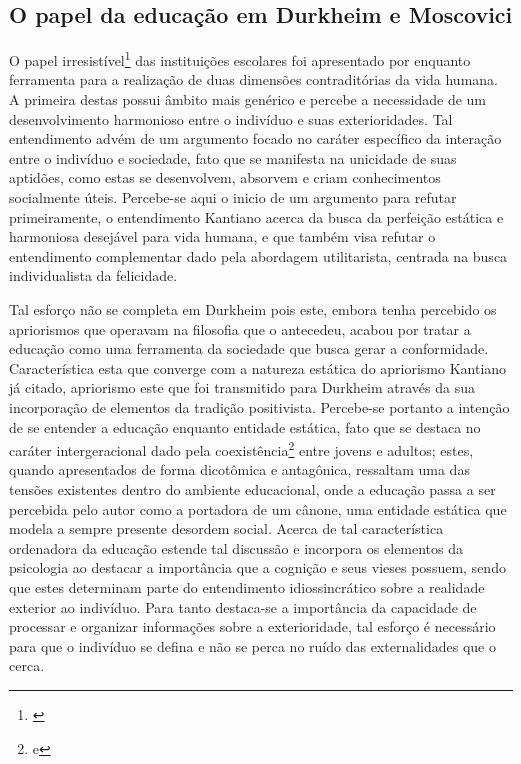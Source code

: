 \documentclass[
   article,       %
   12pt,          %
   oneside,       %
   a4paper,       %
   english,       %
   brazil,           %
   sumario=tradicional
   ]{abntex2}
\begin{document}
\subsection{O papel da educação em Durkheim e Moscovici}

O papel irresistível\footnote{\cite[p.47]{Durkheim_Educacao}} das instituições escolares foi apresentado por \cite{Durkheim_Educacao} enquanto ferramenta para a realização de duas dimensões contraditórias da vida humana. A primeira destas possui âmbito mais genérico e percebe a necessidade de um desenvolvimento harmonioso entre o indivíduo e suas exterioridades. Tal entendimento advém de um argumento focado no caráter específico da interação entre o indivíduo e sociedade, fato que se manifesta na unicidade de suas aptidões, como estas se desenvolvem, absorvem e criam conhecimentos socialmente úteis. Percebe-se aqui o inicio de um argumento para refutar primeiramente, o entendimento Kantiano acerca da busca da perfeição estática e harmoniosa desejável para vida humana, e que também visa refutar o entendimento complementar dado pela abordagem utilitarista, centrada na busca individualista da felicidade. 

Tal esforço não se completa em Durkheim pois este, embora tenha percebido os apriorismos que operavam na filosofia que o antecedeu, acabou por tratar a educação como uma ferramenta da sociedade que busca gerar a conformidade. Característica esta que converge com a natureza estática do apriorismo Kantiano já citado, apriorismo este que foi transmitido para Durkheim através da sua incorporação de elementos da tradição positivista. Percebe-se portanto a intenção de se entender a educação enquanto entidade estática, fato que se destaca no caráter intergeracional dado pela coexistência\footnote{\cite[p.49]{Durkheim_Educacao} e } entre jovens e adultos; estes, quando apresentados de forma dicotômica e antagônica, ressaltam uma das tensões existentes dentro do ambiente educacional, onde a educação passa a ser percebida pelo autor como a portadora de um cânone, uma entidade estática que modela a sempre presente desordem social. Acerca de tal característica ordenadora da educação \cite[p.30]{Representacees_sociais_moscovici} estende tal discussão e incorpora os elementos da psicologia ao destacar a importância que a cognição e seus vieses possuem, sendo que estes determinam parte do entendimento idiossincrático sobre a realidade exterior ao indivíduo. Para tanto destaca-se a importância da capacidade de processar e organizar informações sobre a exterioridade, tal esforço é necessário para que o indivíduo se defina e não se perca no ruído das externalidades que o cerca. 
\end{document}
